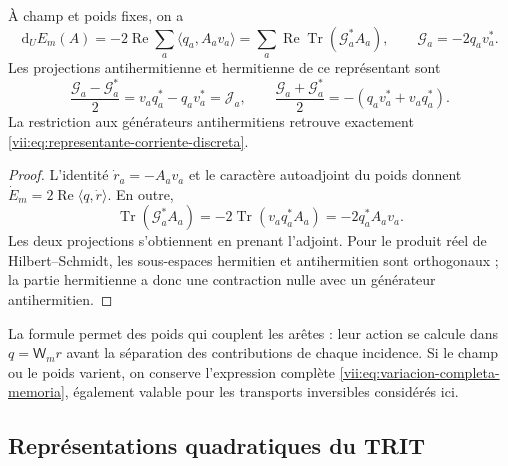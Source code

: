 \begin{proposition}
\label{vii:prop:diferencial-invertible}
À champ et poids fixes, on a
\begin{equation}
 \mathrm d_UE_m(A)=-2\operatorname{Re}\sum_a
       \langle q_a,A_av_a\rangle
 =\sum_a\operatorname{Re}\operatorname{Tr}(\mathcal G_a^*A_a),
 \qquad \mathcal G_a=-2q_av_a^*.
 \label{vii:eq:gradiente-transporte-completo}
\end{equation}
Les projections antihermitienne et hermitienne de ce représentant sont
\begin{equation}
 \frac{\mathcal G_a-\mathcal G_a^*}{2}
   =v_aq_a^*-q_av_a^*=\mathcal J_a,
 \qquad
 \frac{\mathcal G_a+\mathcal G_a^*}{2}
   =-(q_av_a^*+v_aq_a^*).
 \label{vii:eq:proyecciones-gradiente-memoria}
\end{equation}
La restriction aux générateurs antihermitiens retrouve exactement
\eqref{vii:eq:representante-corriente-discreta}.
\end{proposition}

\begin{proof}
L'identité \(\dot r_a=-A_av_a\) et le caractère autoadjoint du poids donnent \(\dot E_m=2\operatorname{Re}\langle q,\dot r\rangle\). En outre,
\[
 \operatorname{Tr}(\mathcal G_a^*A_a)
 =-2\operatorname{Tr}(v_aq_a^*A_a)=-2q_a^*A_av_a.
\]
Les deux projections s'obtiennent en prenant l'adjoint. Pour le produit
réel de Hilbert--Schmidt, les sous-espaces hermitien et antihermitien sont
orthogonaux ; la partie hermitienne a donc une contraction nulle avec
un générateur antihermitien.
\end{proof}

La formule permet des poids qui couplent les arêtes : leur action se calcule dans
\(q=\mathsf W_mr\) avant la séparation des contributions de chaque
incidence. Si le champ ou le poids varient, on conserve l'expression complète
\eqref{vii:eq:variacion-completa-memoria}, également valable pour les
transports inversibles considérés ici.

\subsection{Représentations quadratiques du TRIT}

